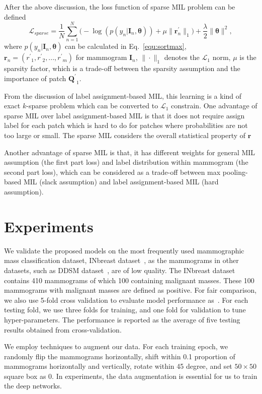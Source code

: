 \documentclass[runningheads,a4paper]{llncs}
\begin{document}
After the above discussion, the loss function of sparse MIL problem can be defined
\begin{equation}
\label{equ:weightedsparseloss}
\mathcal{L}_{sparse} = \frac{1}{N}\sum_{n=1}^{N} \big ( -\log(p(y_n | \bm{I}_n, \bm{\theta})) + \mu \|\bm{r}^{\prime}_n\|_1 \big ) +\frac{\lambda}{2} \|\bm{\theta}\|^2,
\end{equation}
where $p(y_n | \bm{I}_n, \bm{\theta})$ can be calculated in Eq.~\ref{equ:sortmax}, $\bm{r}_n = ({r^\prime}_1, {r^\prime}_2, ..., {r^\prime}_m)$ for mammogram $\bm{I}_n$, $\|\cdot\|_1$ denotes the $\mathcal{L}_1$ norm, $\mu$ is the sparsity factor, which is a trade-off between the sparsity assumption and the importance of patch ${\bm{Q}^\prime}_1$.

From the discussion of label assignment-based MIL, this learning is a kind of exact $k$-sparse problem which can be converted to $\mathcal{L}_1$ constrain. One advantage of sparse MIL over label assignment-based MIL is that it does not require assign label for each patch which is hard to do for patches where probabilities are not too large or small. The sparse MIL considers the overall statistical property of $\bm{r}$%

Another advantage of sparse MIL is that, it has different weights for general MIL assumption (the first part loss) and label distribution within mammogram (the second part loss), which can be considered as a trade-off between max pooling-based MIL (slack assumption) and label assignment-based MIL (hard assumption).
\section{Experiments}\label{sec:exp}
We validate the proposed models on the most frequently used mammographic mass classification dataset, INbreast dataset~\cite{moreira2012inbreast}, as the mammograms in other datasets, such as DDSM dataset~\cite{bowyer1996digital}, are of low quality. The INbreast dataset contains 410 mammograms of which 100 containing malignant masses. These 100 mammograms with malignant masses are defined as positive. For fair comparison, we also use 5-fold cross validation to evaluate model performance as~\cite{dhungel2016automated}. For each testing fold, we use three folds for training, and one fold for validation to tune hyper-parameters. The performance is reported as the average of five testing results obtained from cross-validation.

We employ techniques to augment our data. For each training epoch, we randomly flip the mammograms horizontally, shift within 0.1 proportion of mammograms horizontally and vertically, rotate within 45 degree, and set $50 \times 50$ square box as 0. In experiments, the data augmentation is essential for us to train the deep networks.
\end{document}
